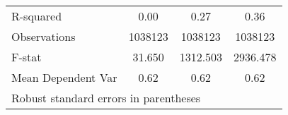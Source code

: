 {\begin{tabular}{l*{3}{c}}
\hline
R-squared           &        0.00         &        0.27         &        0.36         \\
Observations        &     1038123         &     1038123         &     1038123         \\
F-stat              &      31.650         &    1312.503         &    2936.478         \\
Mean Dependent Var  &        0.62         &        0.62         &        0.62         \\
\hline\hline
\multicolumn{4}{l}{\footnotesize Robust standard errors in parentheses}\\
\end{tabular}
}
